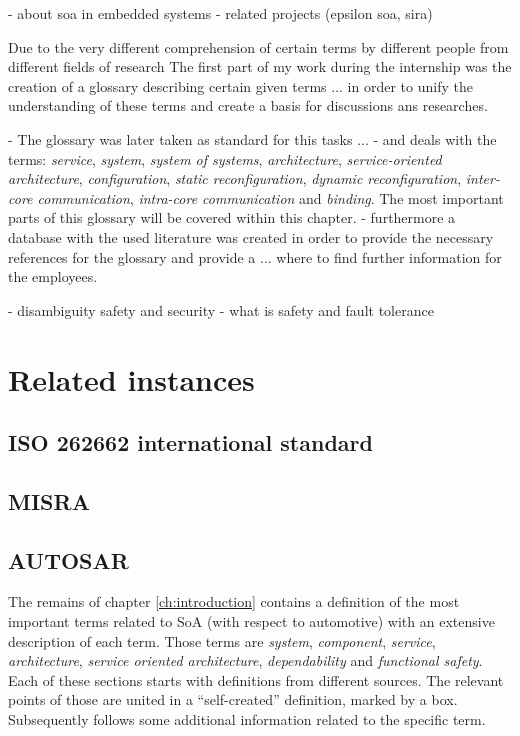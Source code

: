 \label{ch:introduction}
- about soa in embedded systems
- related projects (epsilon soa, sira)

Due to the very different comprehension of certain terms by different people from different fields of research 
The first part of my work during the internship was the creation of a glossary describing certain given terms
... in order to unify the understanding of these terms and create a basis for discussions ans researches.

- The glossary was later taken as standard for this tasks ...
- and deals with the terms: \emph{service}, \emph{system}, \emph{system of systems}, \emph{architecture}, \emph{service-oriented architecture}, \emph{configuration}, \emph{static reconfiguration}, \emph{dynamic reconfiguration}, \emph{inter-core communication}, \emph{intra-core communication} and \emph{binding}.
The most important parts of this glossary will be covered within this chapter.
- furthermore a database with the used literature was created in order to provide the necessary references for the glossary and provide a ... where to find further information for the employees. 

- disambiguity safety and security
- what is safety and fault tolerance

\section{Related instances}
\subsection{ISO 262662 international standard}
\subsection{MISRA}
\subsection{AUTOSAR}

The remains of chapter \ref{ch:introduction} contains a definition of the most important terms related to SoA (with respect to automotive) with an extensive description of each term. Those terms are \emph{system}, \emph{component}, \emph{service}, \emph{architecture}, \emph{service oriented architecture}, \emph{dependability} and \emph{functional safety}. Each of these sections starts with definitions from different sources. The relevant points of those are united in a ``self-created'' definition, marked by a box. Subsequently follows some additional information related to the specific term.



